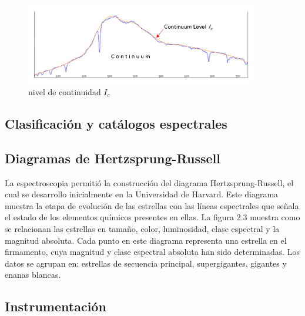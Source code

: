 \begin{figure}[htb!]
\centering
\includegraphics[width=0.9\textwidth]{images/8.jpeg}
\caption[Descripción versión comprimida]{nivel de continuidad $I_c$\cite{libro}}
 \label{fig2}
\end{figure}




\subsection {Clasificación y catálogos espectrales}









\subsection {Diagramas de Hertzsprung-Russell}


\noindent La espectroscopia permitió la construcción del diagrama Hertzsprung-Russell, el cual se desarrollo inicialmente en la Universidad de Harvard.
Este diagrama muestra la etapa de evolución de las estrellas con las líneas espectrales que señala el estado de los elementos químicos presentes en ellas. La figura 2.3 muestra como se relacionan las estrellas en tamaño, color, luminosidad, clase espectral y la magnitud absoluta. Cada punto en este diagrama representa una estrella en el firmamento, cuya magnitud y clase espectral absoluta han sido determinadas. Los datos se agrupan en: estrellas de secuencia principal, supergigantes, gigantes y enanas
blancas.




\subsection{Instrumentación}

